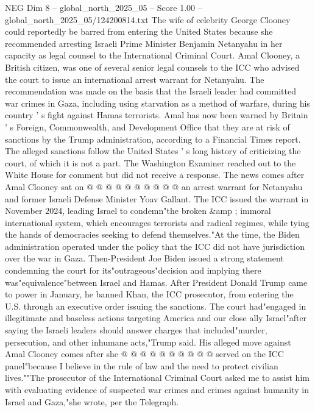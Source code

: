 \begin{textsample}{NEG Dim 8 – global\_north\_2025\_05 – Score 1.00 – global\_north\_2025\_05/124200814.txt}  \label{ex:f8_neg_413}
The wife of celebrity George Clooney could reportedly be barred from entering the United States because she recommended arresting Israeli Prime Minister Benjamin Netanyahu in her capacity as legal counsel to the International Criminal Court.
Amal Clooney, a British citizen, was one of several senior legal counsels to the ICC who advised the court to issue an international arrest warrant for Netanyahu.
The recommendation was made on the basis that the Israeli leader had committed war crimes in Gaza, including using starvation as a method of warfare, during his country ' s fight against Hamas terrorists.
Amal has now been warned by Britain ' s Foreign, Commonwealth, and Development Office that they are at risk of sanctions by the Trump administration, according to a Financial Times report.
The alleged sanctions follow the United States ' s long history of criticizing the court, of which it is not a part.
The Washington Examiner reached out to the White House for comment but did not receive a response.
The news comes after Amal Clooney sat on @ @ @ @ @ @ @ @ @ @ an arrest warrant for Netanyahu and former Israeli Defense Minister Yoav Gallant.
The ICC issued the warrant in November 2024, leading Israel to condemn"the broken \&amp ; immoral international system, which encourages terrorists and radical regimes, while tying the hands of democracies seeking to defend themselves."At the time, the Biden administration operated under the policy that the ICC did not have jurisdiction over the war in Gaza.
Then-President Joe Biden issued a strong statement condemning the court for its"outrageous"decision and implying there was"equivalence"between Israel and Hamas.
After President Donald Trump came to power in January, he banned Khan, the ICC prosecutor, from entering the U.S. through an executive order issuing the sanctions.
The court had"engaged in illegitimate and baseless actions targeting America and our close ally Israel"after saying the Israeli leaders should answer charges that included"murder, persecution, and other inhumane acts,"Trump said.
His alleged move against Amal Clooney comes after she @ @ @ @ @ @ @ @ @ @ served on the ICC panel"because I believe in the rule of law and the need to protect civilian lives.""The prosecutor of the International Criminal Court asked me to assist him with evaluating evidence of suspected war crimes and crimes against humanity in Israel and Gaza,"she wrote, per the Telegraph.

\end{textsample}

